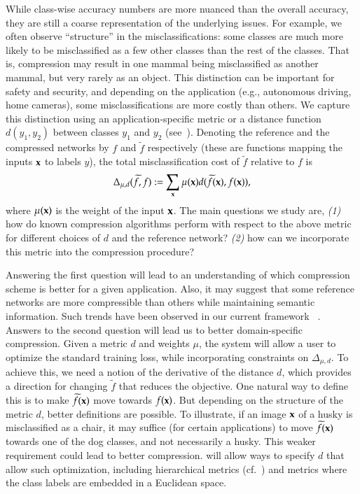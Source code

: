 While class-wise accuracy numbers are more nuanced than the overall accuracy, they are still a coarse representation of the underlying issues. For example, we often observe ``structure'' in the misclassifications: some classes are much more likely to be misclassified as a few other classes than the rest of the classes.  That is, compression may result in one mammal being misclassified as another mammal, but very rarely as an object. This distinction can be important for safety and security, and depending on the application (e.g., autonomous driving, home cameras), some misclassifications are more costly than others. We capture this distinction using an application-specific metric or a distance function $d(y_1,y_2)$ between classes $y_1$ and $y_2$ (see~\cite{qin2018verification}). Denoting the reference and the compressed networks by $f$ and $\widetilde{f}$ respectively (these are functions mapping the inputs ${\bf x}$ to labels $y$), the total misclassification cost of $\widetilde{f}$ relative to $f$ is
\[ \Delta_{\mu, d}(\widetilde{f}, f) :=  \sum_{{\bf x}} \mu ({\bf x}) d(\widetilde{f}({\bf x}), f({\bf x})),\]
where $\mu({\bf x})$ is the weight of the input ${\bf x}$.  The main questions we study are, \textit{(1)} how do known compression algorithms perform with respect to the above metric for different choices of $d$ and the reference network? \textit{(2)} how can we incorporate this metric into the compression procedure?\label{tmc-measure}
%

Answering the first question will lead to an understanding of which compression scheme is better for a given application. Also, it may suggest that some reference networks are more compressible than others while maintaining semantic information. Such trends have been observed in our current framework ~\cite{joseph2019programmable}. 
%
Answers to the second question will lead us to
better domain-specific compression. 
%
Given a metric $d$ and weights $\mu$, the \ardent{} system will allow a user to optimize the standard training loss, while incorporating constraints on $\Delta_{\mu, d}$.  To achieve this, we need a notion of the derivative of the distance $d$, which provides a direction for changing $\widetilde{f}$ that reduces the objective. One natural way to define this is to make $\widetilde{f}({\bf x})$ move towards $f({\bf x})$.  But depending on the structure of the metric $d$, better definitions are possible. To illustrate, if an image ${\bf x}$ of a husky is misclassified as a chair, it may suffice (for certain applications) to move $\widetilde{f}({\bf x})$ towards one of the dog classes, and not necessarily a husky. This weaker requirement could lead to better compression.  \ardent{} will allow ways to specify $d$ that allow such optimization, including hierarchical metrics (cf.~\cite{Babenko2009SimilarityMF,Bengio2010Label}) and metrics 
where the class labels are embedded in a Euclidean space.\label{hier-metrics}

